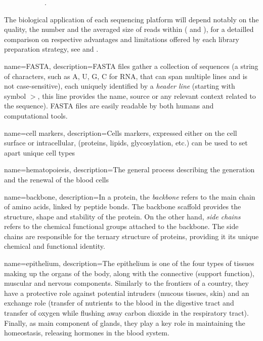 {{\begin{figure}
\begin{subfigure}[p]{0.95\textwidth}
         \label{subfig:extensive-library-comparison}
         \caption[\textbf{Comprehensive comparison of RNA sequencing applications:}]{ \autocite[Fig. 1]{depledge_etal19}.}
     \end{subfigure}
   \caption[\textbf{Pros and cons of short-read (\Gls{illumina}) or long-read-based (PacBio and Nanopore) sequencing platforms}]{}
    \label{fig:rnaseq-libraries}
\end{figure}
The biological application of each sequencing platform will depend notably on the quality, the number and the averaged size of reads within (
 and ), for a detailled comparison on respective advantages and 
limitations offered by each library preparation strategy, see \autocite{head_etal14} and \autocite{stark_etal19}.
}}



{name=FASTA, 
description={FASTA files gather a collection of sequences (a string of characters, 
such as A, U, G, C for RNA, that can span multiple lines and is not case-sensitive), 
each uniquely identified by a \emph{header line} 
(starting with symbol $>$, this line provides the name, source or any relevant context related to the sequence). 
FASTA files are easily readable by both humans and computational tools.}}

{name=cell markers, 
description={Cells markers, expressed either on the cell surface or intracellular, (proteins, lipids, glycosylation, etc.) can be used to set apart unique cell types}}

{name=hematopoiesis, 
description={The general process describing the generation and the renewal of the blood cells}}

{name=backbone, 
description={In a protein, the \textit{backbone} refers to the main chain of amino acids, linked by peptide bonds. The backbone scaffold provides the structure, shape and stability of the protein. On the other hand, \textit{side chains} refers to the chemical functional groups attached to the backbone. The side chains are responsible for the ternary structure of proteins, providing it its unique chemical and functional identity.
}}

{name=epithelium, 
description={The epithelium is one of the four types of tissues making up the organs of the body, along with the connective (support function), muscular and nervous components. 
Similarly to the frontiers of a country, they have a protective role against potential intruders (mucous tissues, skin) and an exchange role (transfer of nutrients to the blood in the digestive tract and transfer of oxygen while flushing away carbon dioxide in the respiratory tract). Finally, as main component of glands, they play a key role in maintaining the homeostasis, releasing hormones in the blood system.  
}}

